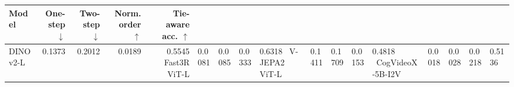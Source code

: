 \begin{tabular}{lrrrr}
\toprule
Model & One-step $\downarrow$ & Two-step $\downarrow$ & Norm. order $\uparrow$ & Tie-aware acc. $\uparrow$ \\
\midrule
DINOv2-L & 0.1373 & 0.2012 & 0.0189 & 0.5545 \
Fast3R ViT-L & 0.0081 & 0.0085 & 0.0333 & 0.6318 \
V-JEPA2 ViT-L & 0.1411 & 0.1709 & 0.0153 & 0.4818 \
CogVideoX-5B-I2V & 0.0018 & 0.0028 & 0.0218 & 0.5136 \
\bottomrule
\end{tabular}

